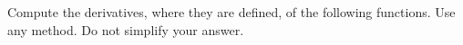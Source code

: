 \documentclass[addpoints,12pt]{exam}
\begin{document}
\begin{questions}

\newpage




\question Compute the derivatives, where they are defined, of the following functions. Use any
method. Do not simplify your answer.

\end{questions}
\end{document}
